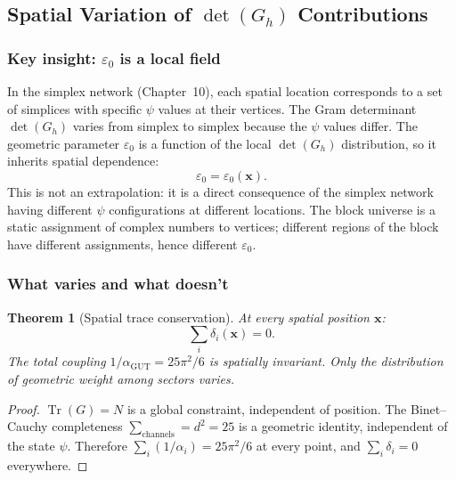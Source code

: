 \documentclass[12pt]{article}
\newtheorem{theorem}{Theorem}[section]
\theoremstyle{remark}
\theoremstyle{definition}
\newcommand{\tr}{\operatorname{Tr}}
\newcommand{\agut}{\alpha_{\mathrm{GUT}}}
\begin{document}
\subsection{Spatial Variation of $\det(G_h)$ Contributions}

\subsubsection{Key insight: $\varepsilon_0$ is a local field}

In the simplex network (Chapter~10), each spatial location corresponds to a set of simplices with specific $\psi$ values at their vertices. The Gram determinant $\det(G_h)$ varies from simplex to simplex because the $\psi$ values differ. The geometric parameter $\varepsilon_0$ is a function of the local $\det(G_h)$ distribution, so it inherits spatial dependence:
\begin{equation}
\varepsilon_0 = \varepsilon_0(\mathbf{x}).
\end{equation}
This is not an extrapolation: it is a direct consequence of the simplex network having different $\psi$ configurations at different locations. The block universe is a static assignment of complex numbers to vertices; different regions of the block have different assignments, hence different $\varepsilon_0$.

\subsubsection{What varies and what doesn't}

\begin{theorem}[Spatial trace conservation]
At every spatial position $\mathbf{x}$:
\begin{equation}
\sum_i \delta_i(\mathbf{x}) = 0.
\end{equation}
The total coupling $1/\agut = 25\pi^2/6$ is spatially invariant. Only the distribution of geometric weight among sectors varies.
\end{theorem}

\begin{proof}
$\tr(G) = N$ is a global constraint, independent of position. The Binet--Cauchy completeness $\sum_\text{channels} = d^2 = 25$ is a geometric identity, independent of the state $\psi$. Therefore $\sum_i(1/\alpha_i) = 25\pi^2/6$ at every point, and $\sum_i \delta_i = 0$ everywhere.
\end{proof}
\end{document}
